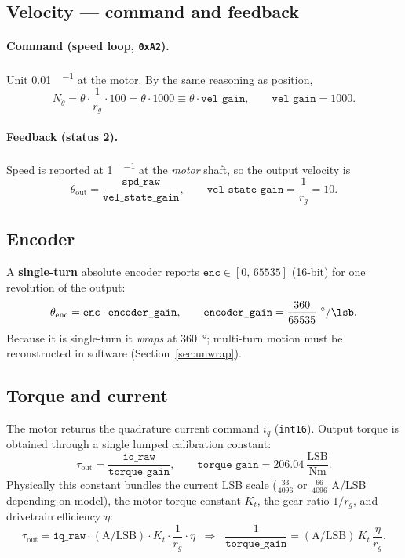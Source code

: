 \documentclass[11pt,a4paper]{article}
\newcommand{\code}[1]{\texttt{#1}}
\begin{document}
\subsection{Velocity --- command and feedback}
\paragraph{Command (speed loop, \texttt{0xA2}).} Unit \SI{0.01}{\dpsu\per\lsb} at the
motor. By the same reasoning as position,
\begin{equation}
  N_{\dot\theta} = \dot\theta\cdot \frac{1}{r_g}\cdot 100
                 = \dot\theta\cdot 1000 \equiv \dot\theta\cdot\texttt{vel\_gain},
  \qquad \texttt{vel\_gain}=1000.
\end{equation}
\paragraph{Feedback (status 2).} Speed is reported at \SI{1}{\dpsu\per\lsb} at the
\emph{motor} shaft, so the output velocity is
\begin{equation}
  \dot\theta_{\text{out}} = \frac{\texttt{spd\_raw}}{\texttt{vel\_state\_gain}},
  \qquad \texttt{vel\_state\_gain} = \frac{1}{r_g}=10 .
\end{equation}

\subsection{Encoder}
A \textbf{single-turn} absolute encoder reports
$\texttt{enc}\in[0,\,65535]$ (16-bit) for one revolution of the output:
\begin{equation}
  \theta_{\text{enc}} = \texttt{enc}\cdot\texttt{encoder\_gain},
  \qquad \texttt{encoder\_gain} = \frac{360}{65535}\ \si{\degree\per\lsb}.
\end{equation}
Because it is single-turn it \emph{wraps} at \SI{360}{\degree}; multi-turn
motion must be reconstructed in software (Section~\ref{sec:unwrap}).

\subsection{Torque and current}
The motor returns the quadrature current command $i_q$ (\code{int16}). Output
torque is obtained through a single lumped calibration constant:
\begin{equation}
  \tau_{\text{out}} = \frac{\texttt{iq\_raw}}{\texttt{torque\_gain}},
  \qquad \texttt{torque\_gain} = 206.04\ \frac{\text{LSB}}{\si{\newton\meter}} .
\end{equation}
Physically this constant bundles the current LSB scale ($\tfrac{33}{4096}$ or
$\tfrac{66}{4096}$ A/LSB depending on model), the motor torque constant $K_t$,
the gear ratio $1/r_g$, and drivetrain efficiency $\eta$:
\begin{equation}
  \tau_{\text{out}} = \texttt{iq\_raw}\cdot(\text{A/LSB})\cdot K_t\cdot \frac{1}{r_g}\cdot\eta
  \;\;\Longrightarrow\;\;
  \frac{1}{\texttt{torque\_gain}} = (\text{A/LSB})\,K_t\,\frac{\eta}{r_g}.
\end{equation}
\end{document}
